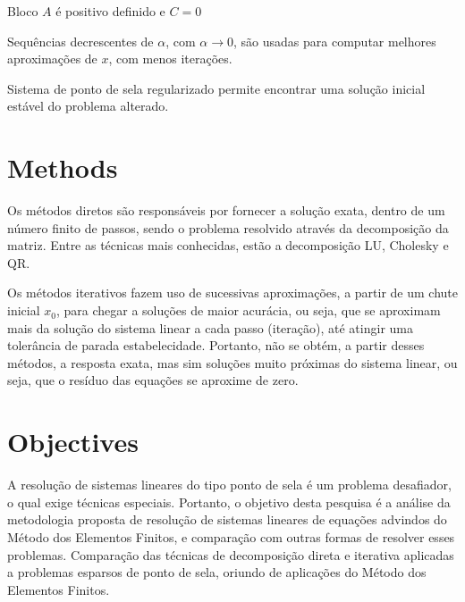\documentclass[12pt]{article}
\begin{document}
Bloco \(A\) é positivo definido e \(C=0\)

Sequências decrescentes de \(\alpha{}\), com \(\alpha{} \rightarrow{} 0\), são usadas para computar melhores aproximações de \(x\), 
com menos iterações.


Sistema de ponto de sela regularizado permite encontrar uma solução inicial estável do problema alterado.

\section{Methods}

Os métodos diretos são responsáveis por fornecer a solução exata, dentro de um número finito de passos, sendo o problema resolvido através da decomposição da matriz. 
Entre as técnicas mais conhecidas, estão a decomposição LU, Cholesky e QR.

Os métodos iterativos fazem uso de sucessivas aproximações, a partir de um chute inicial \(x_0\), para chegar a soluções de maior acurácia, ou seja, 
que se aproximam mais da solução do sistema linear a cada passo (iteração), até atingir uma tolerância de parada estabelecidade. Portanto, não se obtém, 
a partir desses métodos, a resposta exata, mas sim soluções muito próximas do sistema linear, ou seja, que o resíduo das equações se aproxime de zero. 

\section{Objectives}

A resolução de sistemas lineares do tipo ponto de sela é um problema desafiador, o qual exige técnicas especiais. Portanto, o objetivo
desta pesquisa é a análise da metodologia proposta de resolução de sistemas lineares de equações advindos do Método dos Elementos Finitos, 
e comparação com outras formas de resolver esses problemas. Comparação das técnicas de decomposição direta e iterativa aplicadas a 
problemas esparsos de ponto de sela, oriundo de aplicações do Método dos Elementos Finitos. 
\end{document}
